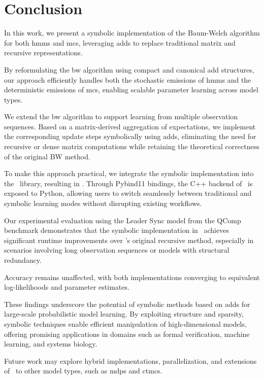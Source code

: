 \section{Conclusion}\label{sec:conclusion}
In this work, we present a symbolic implementation of the Baum-Welch algorithm for both \glspl{hmm} and \glspl{mc}, leveraging \glspl{add} to replace traditional matrix and recursive representations.

By reformulating the \gls{bw} algorithm using compact and canonical \gls{add} structures, our approach efficiently handles both the stochastic emissions of \glspl{hmm} and the deterministic emissions of \glspl{mc}, enabling scalable parameter learning across model types.

We extend the \gls{bw} algorithm to support learning from multiple observation sequences.
Based on a matrix-derived aggregation of expectations, we implement the corresponding update steps symbolically using \glspl{add}, eliminating the need for recursive or dense matrix computations while retaining the theoretical correctness of the original BW method.

To make this approach practical, we integrate the symbolic implementation into the \Jajapy\ library, resulting in \JajapyTwo. Through Pybind11 bindings, the C++ backend of \Cupaal\ is exposed to Python, allowing users to switch seamlessly between traditional and symbolic learning modes without disrupting existing workflows.

Our experimental evaluation using the Leader Sync model from the QComp benchmark demonstrates that the symbolic implementation in \Cupaal\ achieves significant runtime improvements over \Jajapy's original recursive method, especially in scenarios involving long observation sequences or models with structural redundancy.

Accuracy remains unaffected, with both implementations converging to equivalent log-likelihoods and parameter estimates.

These findings underscore the potential of symbolic methods based on \glspl{add} for large-scale probabilistic model learning.
By exploiting structure and sparsity, symbolic techniques enable efficient manipulation of high-dimensional models, offering promising applications in domains such as formal verification, machine learning, and systems biology.

Future work may explore hybrid implementations, parallelization, and extensions of \Cupaal\ to other model types, such as \glspl{mdp} and \glspl{ctmc}.
